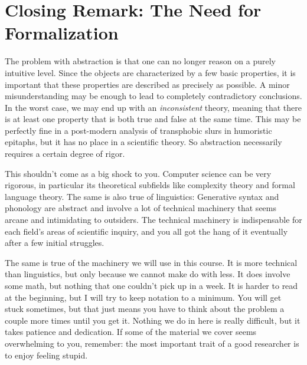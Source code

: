 \section{Closing Remark: The Need for Formalization}

The problem with abstraction is that one can no longer reason on a purely intuitive level.
Since the objects are characterized by a few basic properties, it is important that these properties are described as precisely as possible.
A minor misunderstanding may be enough to lead to completely contradictory conclusions.
In the worst case, we may end up with an \emph{inconsistent} theory, meaning that there is at least one property that is both true and false at the same time.
This may be perfectly fine in a post-modern analysis of transphobic slurs in humoristic epitaphs, but it has no place in a scientific theory.
So abstraction necessarily requires a certain degree of rigor.

This shouldn't come as a big shock to you.
Computer science can be very rigorous, in particular its theoretical subfields like complexity theory and formal language theory.
The same is also true of linguistics:
Generative syntax and phonology are abstract and involve a lot of technical machinery that seems arcane and intimidating to outsiders.
The technical machinery is indispensable for each field's areas of scientific inquiry, and you all got the hang of it eventually after a few initial struggles.

The same is true of the machinery we will use in this course.
It is more technical than linguistics, but only because we cannot make do with less.
It does involve some math, but nothing that one couldn't pick up in a week.
It is harder to read at the beginning, but I will try to keep notation to a minimum.
You will get stuck sometimes, but that just means you have to think about the problem a couple more times until you get it.
Nothing we do in here is really difficult, but it takes patience and dedication.
If some of the material we cover seems overwhelming to you, remember: the most important trait of a good researcher is to enjoy feeling stupid.

